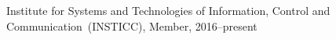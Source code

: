 \documentclass[10pt]{article}
\newcommand{\halfblankline}{\quad\vspace{-0.5\baselineskip}\pagebreak[3]}
\begin{document}
Institute for Systems and Technologies of Information, Control and Communication~(INSTICC), Member, 2016--present
%
\end{document}
